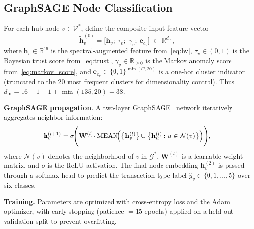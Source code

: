 \subsection{GraphSAGE Node Classification}
\label{subsec:graphsage}

\begin{definition}
\label{def:node_feature}
For each hub node $v\in\mathcal{V}^{*}$, define the composite input feature
vector
\begin{equation}
  \tilde{\mathbf{h}}_{v}^{(0)}
    = \bigl[
        \mathbf{h}_{v};\;
        \tau_{v};\;
        \gamma_{v};\;
        \mathbf{e}_{c_{v}}
      \bigr]
    \;\in\; \mathbb{R}^{d_{\mathrm{in}}},
  \label{eq:composite}
\end{equation}
where $\mathbf{h}_{v}\in\mathbb{R}^{16}$ is the spectral-augmented feature
from~\eqref{eq:hv}, $\tau_{v}\in(0,1)$ is the Bayesian trust score
from~\eqref{eq:trust}, $\gamma_{v}\in\mathbb{R}_{\geq 0}$ is the Markov
anomaly score from~\eqref{eq:markov_score}, and
$\mathbf{e}_{c_{v}}\in\{0,1\}^{\min(C,20)}$ is a one-hot cluster indicator
(truncated to the 20 most frequent clusters for dimensionality control).
Thus $d_{\mathrm{in}} = 16 + 1 + 1 + \min(135, 20) = 38$.
\end{definition}

\noindent\textbf{GraphSAGE propagation.}
A two-layer GraphSAGE~\cite{hamilton2017inductive} network iteratively
aggregates neighbor information:
\begin{equation}
  \mathbf{h}_{v}^{(l+1)}
    = \sigma\!\Biggl(
        \mathbf{W}^{(l)}\!
        \cdot
        \mathrm{MEAN}\!\Bigl(
          \bigl\{\mathbf{h}_{v}^{(l)}\bigr\}
          \cup
          \bigl\{\mathbf{h}_{u}^{(l)} : u\in\mathcal{N}(v)\bigr\}
        \Bigr)
      \Biggr),
  \label{eq:graphsage}
\end{equation}
where $\mathcal{N}(v)$ denotes the neighborhood of $v$ in $\mathcal{G}^{*}$,
$\mathbf{W}^{(l)}$ is a learnable weight matrix, and $\sigma$ is the ReLU
activation.  The final node embedding $\mathbf{h}_{v}^{(2)}$ is passed
through a softmax head to predict the transaction-type label
$\hat{y}_{v}\in\{0,1,\ldots,5\}$ over six classes.

\noindent\textbf{Training.}
Parameters are optimized with cross-entropy loss and the Adam optimizer,
with early stopping (patience $= 15$ epochs) applied on a held-out
validation split to prevent overfitting.


